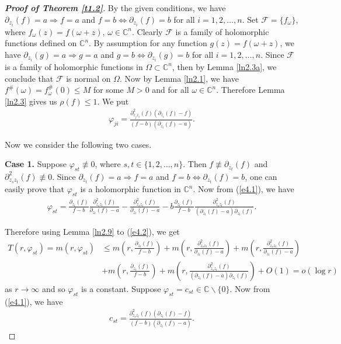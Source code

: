 \documentclass[11pt, reqno]{amsart}
\newtheorem*{cor A}{Corollary A}
\newtheorem*{cor B}{Corollary B}
\numberwithin{equation}{section}
\begin{document}
\begin{proof}[{\bf Proof of Theorem \ref{t1.2}}] 
By the given conditions, we have $\partial_{z_i}(f)=a\Rightarrow f=a$ and $f=b\Leftrightarrow \partial_{z_i}(f)=b$ for all $i=1,2,\ldots,n$.  Set $\mathcal{F}=\{f_{\omega}\}$, where $f_{\omega}(z)=f(\omega+z)$, $\omega\in\mathbb{C}^n$. Clearly $\mathcal{F}$ is a family of holomorphic functions defined on $\mathbb{C}^n$. By assumption for any function $g(z)=f(\omega+z)$, we have $\partial_{z_i}(g)=a\Rightarrow g=a$ and $g=b\Leftrightarrow  \partial_{z_i}(g)=b$ for all $i=1,2,\ldots,n$. Since $\mathcal{F}$ is a family of holomorphic functions in $\Omega\subset\mathbb{C}^n$, then by Lemma \ref{ln2.3a}, we conclude that $\mathcal{F}$ is normal on $\Omega$. Now by Lemma \ref{ln2.1}, we have $f^{\#}(\omega)=f^{\#}_{\omega}(0)\leq M$ for some $M>0$ and for all $\omega\in\mathbb{C}^n$. Therefore Lemma \ref{ln2.3} gives us $\rho(f)\leq 1$. We put 
\begin{align}
\label{e4.1} \varphi_{ji}= \frac{\partial_{z_jz_i}^2(f)(\partial_{z_i}(f)-f)}{(f-b)(\partial_{z_i}(f)-a)}.
\end{align}

Now we consider the following two cases.

\smallskip
{\bf Case 1.} Suppose $\varphi_{st}\not\equiv 0$, where $s,t\in\{1,2,\ldots,n\}$. Then $f\not\equiv \partial_{z_t}(f)$ and $\partial_{z_sz_t}^2(f)\not\equiv 0$. Since $\partial_{z_t}(f)=a\Rightarrow f=a$ and $f=b\Leftrightarrow \partial_{z_t}(f)=b$, one can easily prove that $\varphi_{st}$ is a holomorphic function in $\mathbb{C}^n$. 
Now from (\ref{e4.1}), we have
\begin{align}\label{e4.2} 
\varphi_{st}=\frac{\partial_{z_t}(f)}{f-b}\frac{\partial_{z_sz_t}^2(f)}{\partial_{z_t}(f)-a}-\frac{\partial_{z_sz_t}^2(f)}{\partial_{z_t}(f)-a}-b\frac{\partial_{z_t}(f)}{f-b}\frac{\partial_{z_sz_t}^2(f)}{(\partial_{z_t}(f)-a)\partial_{z_t}(f)}.
\end{align}

Therefore using Lemma \ref{ln2.9} to (\ref{e4.2}), we get
\begin{align*}
 T(r,\varphi_{st})=m(r,\varphi_{st})&\leq m\left(r,\frac{\partial_{z_t}(f)}{f-b}\right)+m\left(r,\frac{\partial_{z_sz_t}^2(f)}{\partial_{z_t}(f)-a}\right)+m\left(r,\frac{\partial_{z_sz_t}^2(f)}{\partial_{z_t}(f)-a}\right)\\&+m\left(r,\frac{\partial_{z_t}(f)}{f-b}\right)+m\left(r,\frac{\partial_{z_sz_t}^2(f)}{(\partial_{z_t}(f)-a)\partial_{z_t}(f)}\right)+O(1)=o(\log r)
\end{align*}
as $r\to\infty$ and so $\varphi_{st}$ is a constant. Suppose $\varphi_{st}=c_{st}\in\mathbb{C}\backslash \{0\}$. Now from (\ref{e4.1}), we have
\begin{align}
\label{e4.3} c_{st}=\frac{\partial_{z_sz_t}^2(f)(\partial_{z_t}(f)-f)}{(f-b)(\partial_{z_t}(f)-a)}.
\end{align}


\end{proof}
\end{document}
